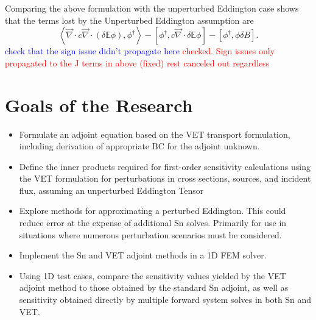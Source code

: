 \documentclass{article}
\newcommand{\bra}{\left\langle}
\newcommand{\ket}{\right\rangle}
\newcommand{\sbra}{\left[}
\newcommand{\sket}{\right]}
\renewcommand{\div}{\vec{\nabla} \cdot}
\newcommand{\Edd}{\mathbb{E}}
\newcommand{\BEdd}{B}
\newcommand{\isigt}{c}
\newcommand{\comment}[2]{\marginpar{\textcolor{#2}{$\star$}}\textcolor{#2}{#1}\newline}
\newcommand{\iwh}[1]{\comment{#1}{red}}
\newcommand{\jcr}[1]{\comment{#1}{blue}}
\newcommand{\iwh}[1]{\phantom{a}}
\newcommand{\jcr}[1]{\phantom{a}}
\begin{document}
Comparing the above formulation with the unperturbed Eddington case shows that the terms lost by the Unperturbed Eddington assumption are 
\begin{equation}
\label{EddErr}
 \bra \div \isigt \div \left( \delta \Edd \phi \right), \phi^\dag \ket
- \sbra  \phi^\dag ,\isigt \div \delta \Edd \phi \sket
- \sbra \phi^\dag, \phi \delta \BEdd \sket.
\end{equation} 
\jcr{check that the sign issue didn't propagate here}
\iwh{checked. Sign issues only propagated to the J terms in above (fixed) rest canceled out regardless}

\section{Goals of the Research}

\begin{itemize}
\item Formulate an adjoint equation based on the VET transport formulation, including derivation of appropriate BC for the adjoint unknown.
\item Define the inner products required for first-order sensitivity calculations using the VET formulation for perturbations in cross sections, sources, and incident flux, assuming an unperturbed Eddington Tensor
\item Explore methods for approximating a perturbed Eddington. This could reduce error at the expense of additional Sn solves. Primarily for use in situations where numerous perturbation scenarios must be considered.
\item Implement the Sn and VET adjoint methods in a 1D FEM solver. 
\item Using 1D test cases, compare the sensitivity values yielded by the VET adjoint method to those obtained by the standard Sn adjoint, as well as sensitivity obtained directly by multiple forward system solves in both Sn and VET.
\end{itemize}
\end{document}
